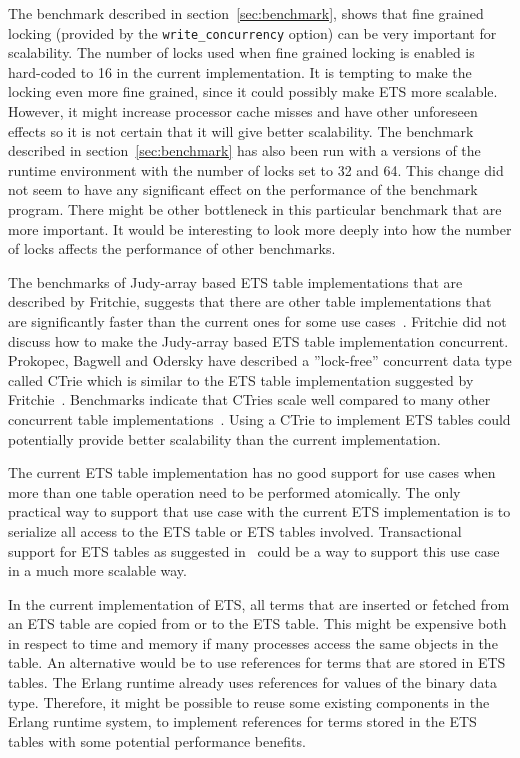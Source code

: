 \documentclass[aps,pre,preprint,nofootinbib]{revtex4}
\begin{document}
The benchmark described in section~\ref{sec:benchmark}, shows that fine grained locking (provided by the \verb|write_concurrency| option) can be very important for scalability.
The number of locks used when fine grained locking is enabled is hard-coded to 16 in the current implementation.
It is tempting to make the locking even more fine grained, since it could possibly make ETS more scalable.
However, it might increase processor cache misses and have other unforeseen effects so it is not certain that it will give better scalability.
The benchmark described in section~\ref{sec:benchmark} has also been run with a versions of the runtime environment with the number of locks set to 32 and 64.
This change did not seem to have any significant effect on the performance of the benchmark program.
There might be other bottleneck in this particular benchmark that are more important.
It would be interesting to look more deeply into how the number of locks affects the performance of other benchmarks.

The benchmarks of Judy-array based ETS table implementations that are described by Fritchie, suggests that there are other table implementations that are significantly faster than the current ones for some use cases~\cite{ScottEtsJudy}.
Fritchie did not discuss how to make the Judy-array based ETS table implementation concurrent.
Prokopec, Bagwell and Odersky have described a ''lock-free'' concurrent data type called CTrie which is similar to the ETS table implementation suggested by Fritchie~\cite{ProkopecCTrie}.
Benchmarks indicate that CTries scale well compared to many other concurrent table implementations~\cite{ProkopecCTrie}.
Using a CTrie to implement ETS tables could potentially provide better scalability than the current implementation.

The current ETS table implementation has no good support for use cases when more than one table operation need to be performed atomically.
The only practical way to support that use case with the current ETS implementation is to serialize all access to the ETS table or ETS tables involved.
Transactional support for ETS tables as suggested in~\cite{PatrikErlangTrans} could be a way to support this use case in a much more scalable way.

In the current implementation of ETS, all terms that are inserted or fetched from an ETS table are copied from or to the ETS table.
This might be expensive both in respect to time and memory if many processes access the same objects in the table.
An alternative would be to use references for terms that are stored in ETS tables.
The Erlang runtime already uses references for values of the binary data type.
Therefore, it might be possible to reuse some existing components in the Erlang runtime system, to implement references for terms stored in the ETS tables with some potential performance benefits.
\end{document}
